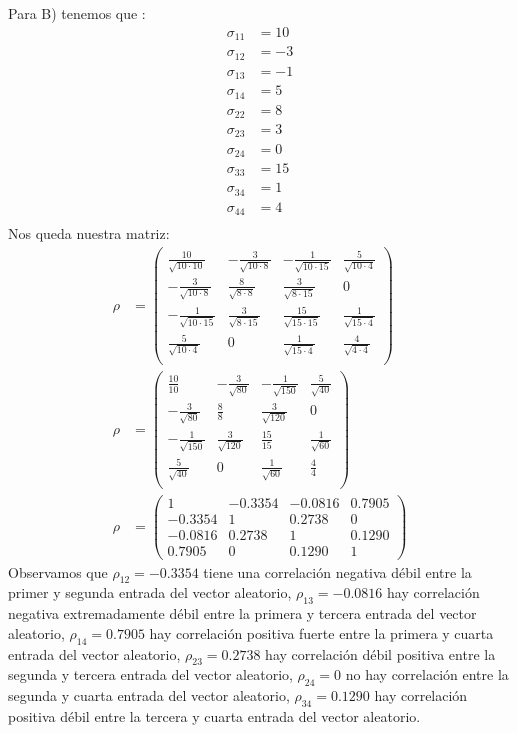 \begin{sol}
Para B) tenemos que :
\begin{align*}
\sigma_{11} &= 10\\
\sigma_{12} &= -3\\
\sigma_{13} &= -1\\
\sigma_{14} &= 5\\
\sigma_{22} &= 8\\
\sigma_{23} &= 3\\
\sigma_{24} &= 0\\
\sigma_{33} &= 15\\
\sigma_{34} &= 1\\
\sigma_{44} &= 4\\
\end{align*}
Nos queda nuestra matriz: 
\begin{align*}
\rho &=
\begin{pmatrix}
\frac{10}{\sqrt{10 \cdot 10}} & -\frac{3}{\sqrt{10 \cdot 8}} & -\frac{1}{\sqrt{10 \cdot 15}} & \frac{5}{\sqrt{10 \cdot 4}} \\
-\frac{3}{\sqrt{10 \cdot 8}} & \frac{8}{\sqrt{8 \cdot 8}} & \frac{3}{\sqrt{8 \cdot 15}} & 0 \\
 -\frac{1}{\sqrt{10 \cdot 15}} & \frac{3}{\sqrt{8 \cdot 15}} & \frac{15}{\sqrt{15 \cdot 15}} & \frac{1}{\sqrt{15 \cdot 4}} \\
 \frac{5}{\sqrt{10 \cdot 4}} &0 &\frac{1}{\sqrt{15 \cdot 4}}  & \frac{4}{\sqrt{4 \cdot 4}} \\
\end{pmatrix}\\
\rho &= 
\begin{pmatrix}
\frac{10}{10} & -\frac{3}{\sqrt{80}}& -\frac{1}{\sqrt{150}}& \frac{5}{\sqrt{40}} \\
-\frac{3}{\sqrt{80}} & \frac{8}{8}& \frac{3}{\sqrt{120}}& 0\\
-\frac{1}{\sqrt{150}} & \frac{3}{\sqrt{120}}& \frac{15}{15}& \frac{1}{\sqrt{60}}\\
\frac{5}{\sqrt{40}} & 0& \frac{1}{\sqrt{60}}& \frac{4}{4}\\
\end{pmatrix}\\
\rho &=
\begin{pmatrix}
1 & -0.3354 & -0.0816 & 0.7905 \\ 
-0.3354 & 1 & 0.2738 & 0 \\ 
-0.0816 & 0.2738 & 1 & 0.1290 \\
0.7905 & 0 & 0.1290 & 1
\end{pmatrix} 
\end{align*}
Observamos que $\rho_{12} = -0.3354$ tiene una correlación negativa débil entre la primer y segunda entrada del vector aleatorio, $\rho_{13}=-0.0816$ hay correlación negativa extremadamente débil entre la primera y tercera entrada del vector aleatorio, $\rho_{14}=0.7905$ hay correlación positiva fuerte entre la primera y cuarta entrada del vector aleatorio, $\rho_{23}=0.2738$ hay correlación débil positiva entre la segunda y tercera entrada del vector aleatorio, $\rho_{24}=0$ no hay correlación entre la segunda y cuarta entrada del vector aleatorio, $\rho_{34}=0.1290$ hay correlación positiva débil entre la tercera y cuarta entrada del vector aleatorio.
\end{sol}